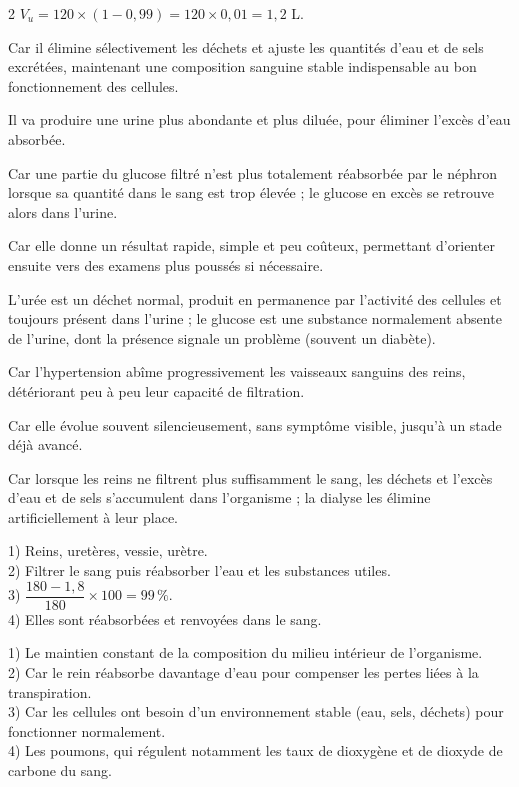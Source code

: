 \begin{multicols}{2}
$V_u=120\times(1-0{,}99)=120\times0{,}01=1{,}2$ L.

Car il élimine sélectivement les déchets et ajuste les quantités d'eau et de sels
excrétées, maintenant une composition sanguine stable indispensable au bon
fonctionnement des cellules.

Il va produire une urine plus abondante et plus diluée, pour éliminer l'excès d'eau
absorbée.

Car une partie du glucose filtré n'est plus totalement réabsorbée par le néphron
lorsque sa quantité dans le sang est trop élevée ; le glucose en excès se retrouve
alors dans l'urine.

Car elle donne un résultat rapide, simple et peu coûteux, permettant d'orienter
ensuite vers des examens plus poussés si nécessaire.

L'urée est un déchet normal, produit en permanence par l'activité des cellules et
toujours présent dans l'urine ; le glucose est une substance normalement absente de
l'urine, dont la présence signale un problème (souvent un diabète).

Car l'hypertension abîme progressivement les vaisseaux sanguins des reins,
détériorant peu à peu leur capacité de filtration.

Car elle évolue souvent silencieusement, sans symptôme visible, jusqu'à un stade déjà
avancé.

Car lorsque les reins ne filtrent plus suffisamment le sang, les déchets et l'excès
d'eau et de sels s'accumulent dans l'organisme ; la dialyse les élimine
artificiellement à leur place.

1) Reins, uretères, vessie, urètre.\\
2) Filtrer le sang puis réabsorber l'eau et les substances utiles.\\
3) $\dfrac{180-1{,}8}{180}\times100=99\,\%$.\\
4) Elles sont réabsorbées et renvoyées dans le sang.

1) Le maintien constant de la composition du milieu intérieur de l'organisme.\\
2) Car le rein réabsorbe davantage d'eau pour compenser les pertes liées à la
transpiration.\\
3) Car les cellules ont besoin d'un environnement stable (eau, sels, déchets) pour
fonctionner normalement.\\
4) Les poumons, qui régulent notamment les taux de dioxygène et de dioxyde de carbone du
sang.


\end{multicols}
